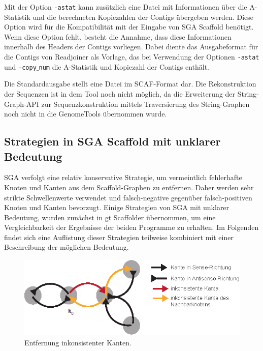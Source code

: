 \documentclass[a4paper,11pt,parskip,abstract=on]{scrartcl}
\begin{document}
Mit der Option \texttt{-astat} kann zusätzlich eine Datei mit Informationen
über die A-Statistik und die berechneten Kopiezahlen der Contigs
übergeben werden. Diese Option wird für die Kompatibilität mit der
Eingabe von SGA Scaffold benötigt. Wenn diese Option fehlt, besteht die
Annahme, dass diese Informationen innerhalb des Headers der
Contigs vorliegen. Dabei diente das Ausgabeformat für die Contigs von
Readjoiner als Vorlage, das bei Verwendung der Optionen \texttt{-astat} und
\texttt{-copy$\_$num} die A-Statistik und Kopiezahl der Contigs enthält.

Die Standardausgabe stellt eine Datei im SCAF-Format dar. Die
Rekonstruktion der Sequenzen ist in dem Tool noch nicht möglich, da
die Erweiterung der String-Graph-API zur Sequenzkonstruktion mittels
Traversierung des String-Graphen noch nicht in die GenomeTools
übernommen wurde.

\subsection{Strategien in SGA Scaffold mit unklarer Bedeutung}
\label{sec: wunderlich}
SGA verfolgt eine relativ konservative Strategie, um vermeintlich
fehlerhafte Knoten und Kanten aus dem Scaffold-Graphen zu
entfernen. Daher werden sehr strikte Schwellenwerte verwendet und
falsch-negative gegenüber falsch-positiven Knoten und Kanten
bevorzugt. Einige Strategien von SGA mit unklarer Bedeutung, wurden
zunächst in gt Scaffolder übernommen, um eine Vergleichbarkeit der
Ergebnisse der beiden Programme zu erhalten. Im Folgenden findet sich
eine Auflistung dieser Strategien teilweise kombiniert mit einer
Beschreibung der möglichen Bedeutung.

\begin{figure}
  \centering
  \includegraphics[width=0.6\linewidth]{inkonsistenteKante.eps}
  \caption{Entfernung inkonsistenter Kanten.}
\label{abb: inkonsistenteKante}
\end{figure}
\end{document}

